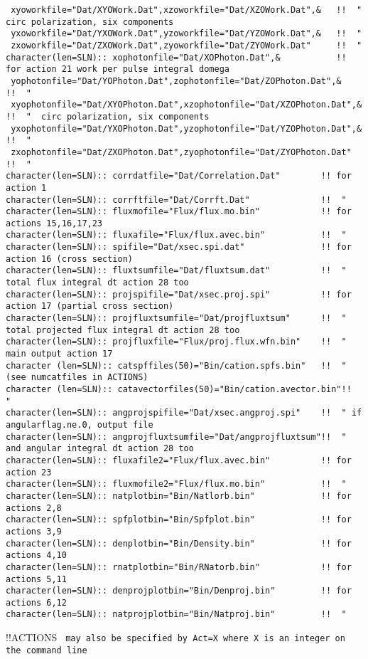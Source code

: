 \begin{verbatim}
 xyoworkfile="Dat/XYOWork.Dat",xzoworkfile="Dat/XZOWork.Dat",&   !!  "  circ polarization, six components
 yxoworkfile="Dat/YXOWork.Dat",yzoworkfile="Dat/YZOWork.Dat",&   !!  "
 zxoworkfile="Dat/ZXOWork.Dat",zyoworkfile="Dat/ZYOWork.Dat"     !!  "
character(len=SLN):: xophotonfile="Dat/XOPhoton.Dat",&           !! for action 21 work per pulse integral domega
 yophotonfile="Dat/YOPhoton.Dat",zophotonfile="Dat/ZOPhoton.Dat",&     !!  "
 xyophotonfile="Dat/XYOPhoton.Dat",xzophotonfile="Dat/XZOPhoton.Dat",& !!  "  circ polarization, six components
 yxophotonfile="Dat/YXOPhoton.Dat",yzophotonfile="Dat/YZOPhoton.Dat",& !!  "
 zxophotonfile="Dat/ZXOPhoton.Dat",zyophotonfile="Dat/ZYOPhoton.Dat"   !!  "
character(len=SLN):: corrdatfile="Dat/Correlation.Dat"        !! for action 1
character(len=SLN):: corrftfile="Dat/Corrft.Dat"              !!  "
character(len=SLN):: fluxmofile="Flux/flux.mo.bin"            !! for actions 15,16,17,23
character(len=SLN):: fluxafile="Flux/flux.avec.bin"           !!  "
character(len=SLN):: spifile="Dat/xsec.spi.dat"               !! for action 16 (cross section)
character(len=SLN):: fluxtsumfile="Dat/fluxtsum.dat"          !!  " total flux integral dt action 28 too
character(len=SLN):: projspifile="Dat/xsec.proj.spi"          !! for action 17 (partial cross section)
character(len=SLN):: projfluxtsumfile="Dat/projfluxtsum"      !!  " total projected flux integral dt action 28 too
character(len=SLN):: projfluxfile="Flux/proj.flux.wfn.bin"    !!  " main output action 17
character (len=SLN):: catspffiles(50)="Bin/cation.spfs.bin"   !!  " (see numcatfiles in ACTIONS)
character (len=SLN):: catavectorfiles(50)="Bin/cation.avector.bin"!!  "
character(len=SLN):: angprojspifile="Dat/xsec.angproj.spi"    !!  " if angularflag.ne.0, output file
character(len=SLN):: angprojfluxtsumfile="Dat/angprojfluxtsum"!!  " and angular integral dt action 28 too
character(len=SLN):: fluxafile2="Flux/flux.avec.bin"          !! for action 23
character(len=SLN):: fluxmofile2="Flux/flux.mo.bin"           !!  "
character(len=SLN):: natplotbin="Bin/Natlorb.bin"             !! for actions 2,8
character(len=SLN):: spfplotbin="Bin/Spfplot.bin"             !! for actions 3,9
character(len=SLN):: denplotbin="Bin/Density.bin"             !! for actions 4,10
character(len=SLN):: rnatplotbin="Bin/RNatorb.bin"            !! for actions 5,11
character(len=SLN):: denprojplotbin="Bin/Denproj.bin"         !! for actions 6,12
character(len=SLN):: natprojplotbin="Bin/Natproj.bin"         !!  "
\end{verbatim} 
!!{\large \quad ACTIONS} \verb# may also be specified by Act=X where X is an integer on the command line #
